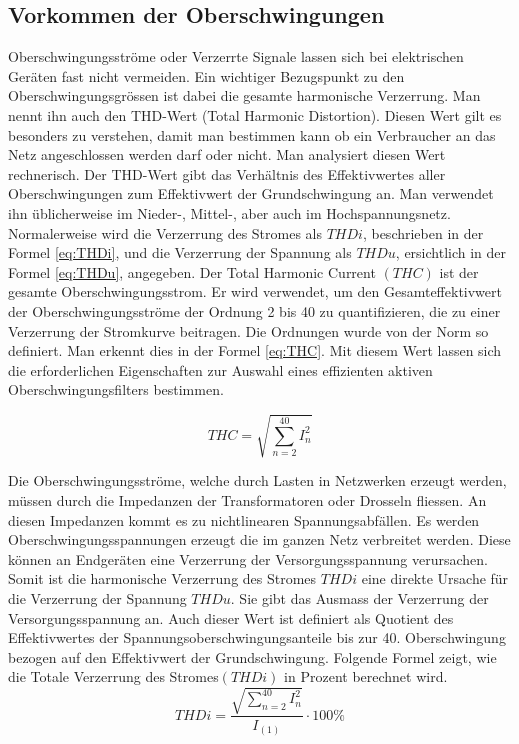 \subsection{Vorkommen der Oberschwingungen}
Oberschwingungsströme oder Verzerrte Signale lassen sich bei elektrischen Geräten fast nicht vermeiden. Ein wichtiger Bezugspunkt zu den Oberschwingungsgrössen ist dabei die gesamte harmonische Verzerrung. Man nennt ihn auch den THD-Wert (Total Harmonic Distortion). Diesen Wert gilt es besonders zu verstehen, damit man bestimmen kann ob ein Verbraucher an das Netz angeschlossen werden darf oder nicht. Man analysiert diesen Wert rechnerisch. Der THD-Wert gibt das Verhältnis des Effektivwertes aller Oberschwingungen zum Effektivwert der Grundschwingung an. Man verwendet ihn üblicherweise im Nieder-, Mittel-, aber auch im Hochspannungsnetz. Normalerweise wird die Verzerrung des Stromes als $THDi$, beschrieben in der Formel \ref{eq:THDi}, und die Verzerrung der Spannung als $THDu$, ersichtlich in der Formel \ref{eq:THDu}, angegeben. Der Total Harmonic Current $(THC)$ ist der gesamte Oberschwingungsstrom. Er wird verwendet, um den Gesamteffektivwert der Oberschwingungsströme der Ordnung 2 bis 40 zu quantifizieren, die zu einer Verzerrung der Stromkurve beitragen. Die Ordnungen wurde von der Norm so definiert. Man erkennt dies in der Formel \ref{eq:THC}. Mit diesem Wert lassen sich die erforderlichen Eigenschaften zur Auswahl eines effizienten aktiven Oberschwingungsfilters bestimmen.

\begin{equation}\label{eq:THC}
THC = {\sqrt{\sum_{n=2}^{40} I_n^2}}
\end{equation}



Die Oberschwingungsströme, welche durch Lasten in Netzwerken erzeugt werden, müssen durch die Impedanzen der Transformatoren oder Drosseln fliessen. An diesen Impedanzen kommt es zu nichtlinearen Spannungsabfällen. Es werden Oberschwingungsspannungen erzeugt die im ganzen Netz verbreitet werden. Diese können an Endgeräten eine Verzerrung der Versorgungsspannung verursachen. Somit ist die harmonische Verzerrung des Stromes $THDi$ eine direkte Ursache für die Verzerrung der Spannung $THDu$. Sie gibt das Ausmass der Verzerrung der Versorgungsspannung an. Auch dieser Wert ist definiert als Quotient des Effektivwertes der Spannungsoberschwingungsanteile bis zur 40. Oberschwingung bezogen auf den Effektivwert der Grundschwingung. 
Folgende Formel zeigt, wie die Totale Verzerrung des Stromes$(THDi)$ in Prozent berechnet wird.
\begin{equation}\label{eq:THDi}
THDi = \frac{\sqrt{\sum_{n=2}^{40} I_n^2}}{I_{(1)}} \cdot 100 \%
\end{equation}

